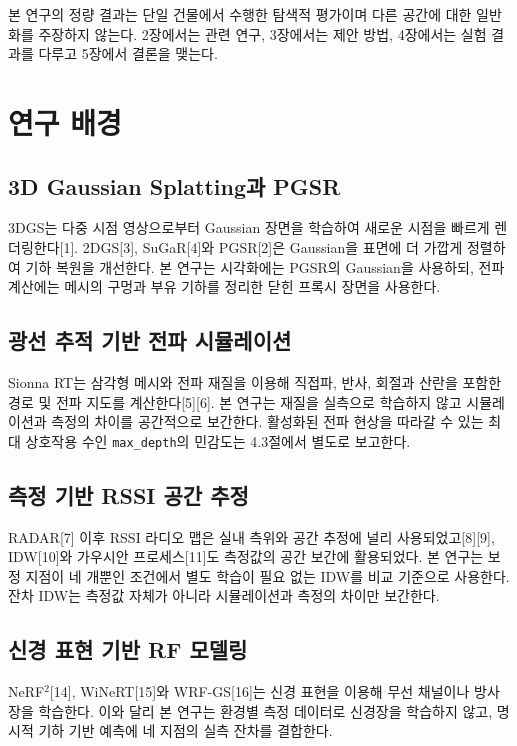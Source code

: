 \documentclass[11pt,a4paper]{article}
\newcommand{\md}{\texttt{max\_depth}}
\begin{document}
본 연구의 정량 결과는 단일 건물에서 수행한 탐색적 평가이며 다른 공간에 대한 일반화를 주장하지 않는다.
2장에서는 관련 연구, 3장에서는 제안 방법, 4장에서는 실험 결과를 다루고 5장에서 결론을 맺는다.

\section{연구 배경}

\subsection{3D Gaussian Splatting과 PGSR}

3DGS는 다중 시점 영상으로부터 Gaussian 장면을 학습하여 새로운 시점을 빠르게 렌더링한다[1].
2DGS[3], SuGaR[4]와 PGSR[2]은 Gaussian을 표면에 더 가깝게 정렬하여 기하 복원을 개선한다. 본
연구는 시각화에는 PGSR의 Gaussian을 사용하되, 전파 계산에는 메시의 구멍과 부유 기하를 정리한 닫힌
프록시 장면을 사용한다.

\subsection{광선 추적 기반 전파 시뮬레이션}

Sionna RT는 삼각형 메시와 전파 재질을 이용해 직접파, 반사, 회절과 산란을 포함한 경로 및 전파 지도를
계산한다[5][6]. 본 연구는 재질을 실측으로 학습하지 않고 시뮬레이션과 측정의 차이를 공간적으로
보간한다. 활성화된 전파 현상을 따라갈 수 있는 최대 상호작용 수인 \md 의 민감도는 4.3절에서 별도로
보고한다.

\subsection{측정 기반 RSSI 공간 추정}

RADAR[7] 이후 RSSI 라디오 맵은 실내 측위와 공간 추정에 널리 사용되었고[8][9], IDW[10]와 가우시안
프로세스[11]도 측정값의 공간 보간에 활용되었다. 본 연구는 보정 지점이 네 개뿐인 조건에서 별도 학습이
필요 없는 IDW를 비교 기준으로 사용한다. 잔차 IDW는 측정값 자체가 아니라 시뮬레이션과 측정의 차이만
보간한다.

\subsection{신경 표현 기반 RF 모델링}

NeRF$^2$[14], WiNeRT[15]와 WRF-GS[16]는 신경 표현을 이용해 무선 채널이나 방사장을 학습한다. 이와
달리 본 연구는 환경별 측정 데이터로 신경장을 학습하지 않고, 명시적 기하 기반 예측에 네 지점의 실측 잔차를
결합한다.
\end{document}
